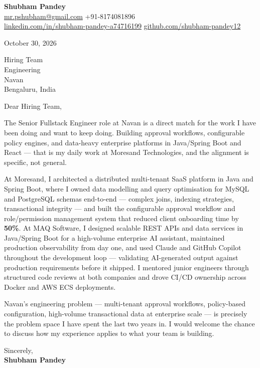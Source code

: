 \documentclass[a4paper,11pt]{article}
\begin{document}
\textbf{\Large Shubham Pandey}\\
\href{mailto:mr.pshubham@gmail.com}{mr.pshubham@gmail.com} \quad +91-8174081896\\
\href{https://www.linkedin.com/in/shubham-pandey-a74716199/}{linkedin.com/in/shubham-pandey-a74716199} \quad
\href{https://github.com/shubham-pandey12}{github.com/shubham-pandey12}

\vspace{1em}
October 30, 2026

\vspace{1em}
Hiring Team\\
Engineering\\
Navan\\
Bengaluru, India

\vspace{1em}
Dear Hiring Team,

The Senior Fullstack Engineer role at Navan is a direct match for the work I have been doing and want to keep doing. Building approval workflows, configurable policy engines, and data-heavy enterprise platforms in Java/Spring Boot and React --- that is my daily work at Moresand Technologies, and the alignment is specific, not general.

At Moresand, I architected a distributed multi-tenant SaaS platform in Java and Spring Boot, where I owned data modelling and query optimisation for MySQL and PostgreSQL schemas end-to-end --- complex joins, indexing strategies, transactional integrity --- and built the configurable approval workflow and role/permission management system that reduced client onboarding time by \textbf{50\%}. At MAQ Software, I designed scalable REST APIs and data services in Java/Spring Boot for a high-volume enterprise AI assistant, maintained production observability from day one, and used Claude and GitHub Copilot throughout the development loop --- validating AI-generated output against production requirements before it shipped. I mentored junior engineers through structured code reviews at both companies and drove CI/CD ownership across Docker and AWS ECS deployments.

Navan's engineering problem --- multi-tenant approval workflows, policy-based configuration, high-volume transactional data at enterprise scale --- is precisely the problem space I have spent the last two years in. I would welcome the chance to discuss how my experience applies to what your team is building.

\vspace{1em}
Sincerely,\\[0.5em]
\textbf{Shubham Pandey}
\end{document}
